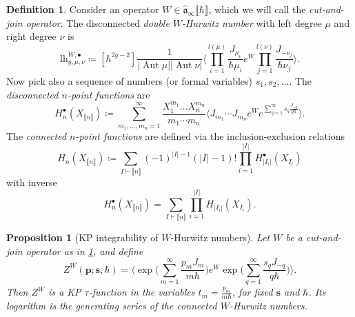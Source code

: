 \documentclass[10pt,a4paper,oneside,no-math,reqno]{amsart}%
\theoremstyle{plain}
\newtheorem{proposition}[theorem]{Proposition}
\theoremstyle{definition}
\newtheorem{definition}[theorem]{Definition}
\theoremstyle{remark}
\numberwithin{equation}{section}
\newcommand{\mf}[1]{\mathfrak{#1}}
\newcommand{\1}{\mathds{1}}
\newcommand{\<}{\langle}
\renewcommand{\>}{\rangle}
\DeclareMathOperator{\Aut}{Aut}
\newcommand{\lh}{\mathord{\mathrm{l\!h}}}
\begin{document}
\begin{definition}\label{DefHNfromCJ}
    Consider an operator $ W \in \widehat{\mf{a}}_\infty \llbracket \hbar \rrbracket $, which we will call the \emph{cut-and-join operator}. The disconnected \emph{double $W$-Hurwitz number} with left degree $ \mu$ and right degree $ \nu$ is
    \begin{equation}\label{DefLH}
        \lh^{W,\bullet}_{g,\mu,\nu}
        \coloneqq
        [\hbar^{2g-2} ]\frac{1}{| \Aut \mu| | \Aut \nu| } \Big\< \prod_{i = 1}^{l (\mu)} \frac{J_{\mu_i}}{\hbar \mu_i} e^W \prod_{j = 1}^{l(\nu)} \frac{J_{-\nu_j}}{\hbar \nu_j} \Big\> .
    \end{equation}
    Now pick also a sequence of numbers (or formal variables) $ s_1, s_2, \dotsc$. The \emph{disconnected $n$-point functions} are
    \begin{equation}
        H_{n}^\bullet (X_{\llbracket n\rrbracket})
        \coloneqq
        \sum_{m_1, \dotsc, m_n = 1}^\infty \frac{X_1^{m_1} \dotsc X_n^{m_n}}{m_1 \dotsb m_n} \Big\< J_{m_1} \dotsb J_{m_n} e^W e^{\sum_{q=1}^\infty s_q \frac{J_{-q}}{q\hbar}} \Big\>.
    \end{equation}
    The \emph{connected $n$-point functions} are defined via the inclusion-exclusion relations
    \begin{equation}
        H_n (X_{\llbracket n \rrbracket})
        \coloneqq
        \sum_{I \vdash \llbracket n \rrbracket} (-1)^{|I|-1} (|I|-1)! \prod_{i=1}^{|I|} H_{|I_i|}^\bullet (X_{I_i})
    \end{equation}
    with inverse
    \begin{equation}
        H_n^\bullet (X_{\llbracket n \rrbracket})
        =
        \sum_{I \vdash \llbracket n \rrbracket} \prod_{i =1}^{|I|} H_{|I_i|} (X_{I_i}) .
    \end{equation}
\end{definition}

\begin{proposition}[KP integrability of $W$-Hurwitz numbers]\label{KPIntegrability}
    Let $W$ be a cut-and-join operator as in \cref{DefHNfromCJ}, and define
    \begin{equation}
        Z^W(\mathbf{p};\mathbf{s},\hbar)
        =
        \Big\<
        \exp\Big(\sum_{m=1}^\infty \frac{p_m J_m}{m\hbar}\Big)
        e^W
        \exp\Big(\sum_{q=1}^\infty \frac{s_q J_{-q}}{q\hbar}\Big)
        \Big\>.
    \end{equation}
    Then $Z^W$ is a KP $\tau$-function in the variables $t_m=\frac{p_m}{m\hbar}$, for fixed $\mathbf{s}$ and $\hbar$. Its logarithm is the generating series of the connected $W$-Hurwitz numbers.
\end{proposition}
\end{document}
